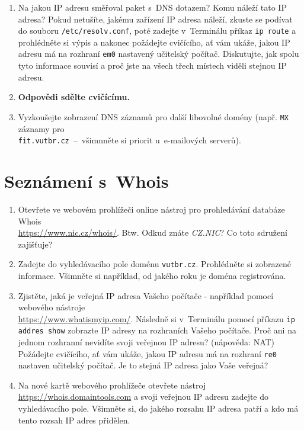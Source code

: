 \begin{enumerate}
    \item Na jakou IP adresu směřoval paket s~DNS dotazem? Komu náleží tato IP adresa? Pokud netušíte, jakému zařízení IP adresa náleží, zkuste se podívat do souboru \texttt{/etc/resolv.conf}, poté zadejte v~Terminálu příkaz \texttt{ip route} a prohlédněte si výpis a nakonec požádejte cvičícího, ať vám ukáže, jakou IP adresu má na rozhraní \texttt{em0} nastavený učitelský počítač. Diskutujte, jak spolu tyto informace souvisí a proč jste na všech třech místech viděli stejnou IP adresu.
    \item \textbf{Odpovědi sdělte cvičícímu.}
    \item Vyzkoušejte zobrazení DNS záznamů pro další libovolné domény (např. \texttt{MX} záznamy pro\\ \texttt{fit.vutbr.cz}~--~všimnněte si priorit u~e-mailových serverů).
\end{enumerate}

\section{Seznámení s~Whois}
\begin{enumerate}
    \item Otevřete ve webovém prohlížeči online nástroj pro prohledávání databáze Whois\\ \url{https://www.nic.cz/whois/}. Btw. Odkud znáte \emph{CZ.NIC}? Co toto sdružení zajišťuje?
    \item Zadejte do vyhledávacího pole doménu \texttt{vutbr.cz}. Prohlédněte si zobrazené informace. Všimněte si například, od jakého roku je doména registrována.
    \item Zjistěte, jaká je veřejná IP adresa Vašeho počítače - například pomocí webového nástroje\\ \url{https://www.whatismyip.com/}. Následně si v~Terminálu pomocí příkazu \texttt{ip addres show} zobrazte IP adresy na rozhraních Vašeho počítače. Proč ani na jednom rozhranní nevidíte svoji veřejnou IP adresu? (nápověda: NAT) Požádejte cvičícího, ať vám ukáže, jakou IP adresu má na rozhraní \texttt{re0} nastaven učitelský počítač. Je to stejná IP adresa jako Vaše veřejná?
    \item Na nové kartě webového prohlížeče otevřete nástroj \url{https://whois.domaintools.com} a svoji veřejnou IP adresu zadejte do vyhledávacího pole. Všimněte si, do jakého rozsahu IP adresa patří a kdo má tento rozsah IP adres přidělen.
\end{enumerate}

